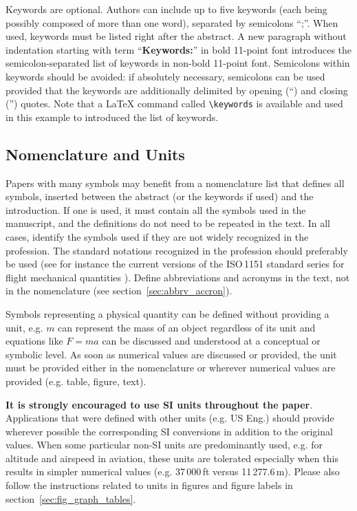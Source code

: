 \documentclass{CEAS_EuroGNC_2024}
\begin{document}
Keywords are optional. Authors can include up to five keywords (each being possibly composed of more than one word), separated by semicolons ``;''. When used, keywords must be listed right after the abstract. A new paragraph without indentation starting with term ``\textbf{Keywords:}'' in bold 11-point font introduces the semicolon-separated list of keywords in non-bold 11-point font. Semicolons within keywords should be avoided: if absolutely necessary, semicolons can be used provided that the keywords are additionally delimited by opening (``) and closing ('') quotes. Note that a \LaTeX{} command called \verb|\keywords| is available and used in this example to introduced the list of keywords.



\subsection{Nomenclature and Units}
Papers with many symbols may benefit from a nomenclature list that defines all symbols, inserted between the abstract (or the keywords if used) and the introduction. If one is used, it must contain all the symbols used in the manuscript, and the definitions do not need to be repeated in the text. In all cases, identify the symbols used if they are not widely recognized in the profession. The standard notations recognized in the profession should preferably be used (see for instance the current versions of the ISO\,1151 standard series for flight mechanical quantities \cite{ISO1151-1:1988,ISO1151-2:1985,ISO1151-2:1985_ADD1:1987,ISO1151-3:1989,ISO1151-3:1989_COR1:1996,ISO1151-4:1994,ISO1151-5:1987,ISO1151-6:1982,ISO1151-7:1985,ISO1151-8:1992,ISO1151-9:1993,ISO1151-9:1993_AMD1:1998}). Define abbreviations and acronyms in the text, not in the nomenclature (see section~\ref{sec:abbrv_accron}).

Symbols representing a physical quantity can be defined without providing a unit, e.g. $m$ can represent the mass of an object regardless of its unit and equations like $F=m a$ can be discussed and understood at a conceptual or symbolic level. As soon as numerical values are discussed or provided, the unit must be provided either in the nomenclature or wherever numerical values are provided (e.g. table, figure, text).

\textbf{It is strongly encouraged to use SI units throughout the paper}. Applications that were defined with other units (e.g. US Eng.) should provide wherever possible the corresponding SI conversions in addition to the original values. When some particular non-SI units are predominantly used, e.g. for altitude and airspeed in aviation, these units are tolerated especially when this results in simpler numerical values (e.g. 37\,000\,ft versus 11\,277.6\,m). Please also follow the instructions related to units in figures and figure labels in section~\ref{sec:fig_graph_tables}.
\end{document}

